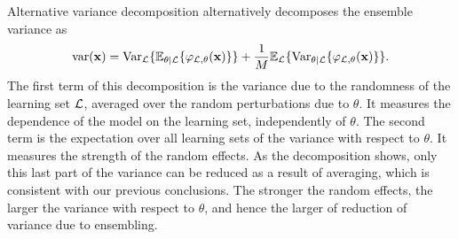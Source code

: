 \begin{remark}{Alternative variance decomposition}
\citet{geurts:2002} alternatively decomposes the ensemble variance as
\begin{equation}\label{eqn:4:variance-geurts}
\text{var}(\mathbf{x}) = \text{Var}_{\cal L} \{ \mathbb{E}_{\theta|{\cal L}} \{ \varphi_{{\cal L},\theta}(\mathbf{x}) \} \} + \frac{1}{M} \mathbb{E}_{\cal L} \{ \text{Var}_{\theta|{\cal L}} \{ \varphi_{{\cal L},\theta}(\mathbf{x}) \} \}.
\end{equation}
The first term of this decomposition is the variance due to the randomness
of the learning set ${\cal L}$, averaged over the random perturbations due to $\theta$. It
measures the dependence of the model on the learning set, independently of
$\theta$. The second term is the expectation over all learning sets of
the variance with respect to $\theta$. It measures the strength of the
random effects. As the decomposition shows, only this last part of the variance
can be reduced as a result of averaging, which is consistent with our previous
conclusions.  The stronger the random effects, the larger the variance with
respect to $\theta$, and hence the larger of reduction of variance due
to ensembling.


\end{remark}
